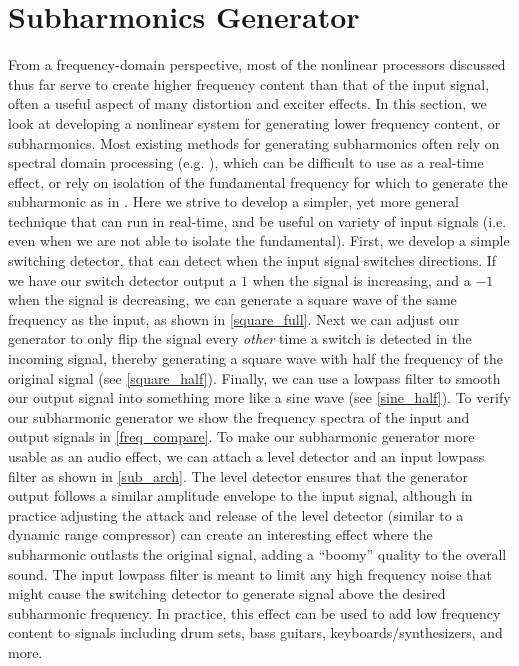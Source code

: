 \documentclass[twoside,a4paper]{article}
\begin{document}
\section{Subharmonics Generator} \label{sec:subharm}
%
From a frequency-domain perspective, most of the nonlinear processors
discussed thus far serve to create higher frequency content than that
of the input signal, often a useful aspect of many distortion and exciter
effects. In this section, we look at developing a nonlinear system for
generating lower frequency content, or subharmonics. Most existing
methods for generating subharmonics often rely on spectral domain
processing (e.g. \cite{sub_spectral}), which can be difficult to use
as a real-time effect, or rely on isolation of the fundamental frequency
for which to generate the subharmonic as in \cite{sub_sqrt}. Here we
strive to develop a simpler, yet more general technique that can run in
real-time, and be useful on  variety of input signals (i.e. even when
we are not able to isolate the fundamental).
\newline\newline
First, we develop a simple switching detector, that can detect when the
input signal switches directions. If we have our switch detector output
a $1$ when the signal is increasing, and a $-1$ when the signal is
decreasing, we can generate a square wave of the same frequency as the
input, as shown in \cref{square_full}. Next we can adjust our generator to
only flip the signal every {\it other} time a switch is detected in the
incoming signal, thereby generating a square wave with half the frequency
of the original signal (see \cref{square_half}). Finally, we can use a
lowpass filter to smooth our output signal into something more like a
sine wave (see \cref{sine_half}). To verify our subharmonic generator
we show the frequency spectra of the input and output signals in
\cref{freq_compare}.
\newline\newline
To make our subharmonic generator more usable as an audio effect, we can
attach a level detector and an input lowpass filter as shown in
\cref{sub_arch}. The level detector ensures that the generator output
follows a similar amplitude envelope to the input signal, although in
practice adjusting the attack and release of the level detector (similar
to a dynamic range compressor) can create an interesting effect where the
subharmonic outlasts the original signal, adding a ``boomy'' quality to
the overall sound. The input lowpass filter is meant to limit any high
frequency noise that might cause the switching detector to generate
signal above the desired subharmonic frequency. In practice,
this effect can be used to add low frequency content to signals
including drum sets, bass guitars, keyboards/synthesizers, and more.
%
\end{document}
